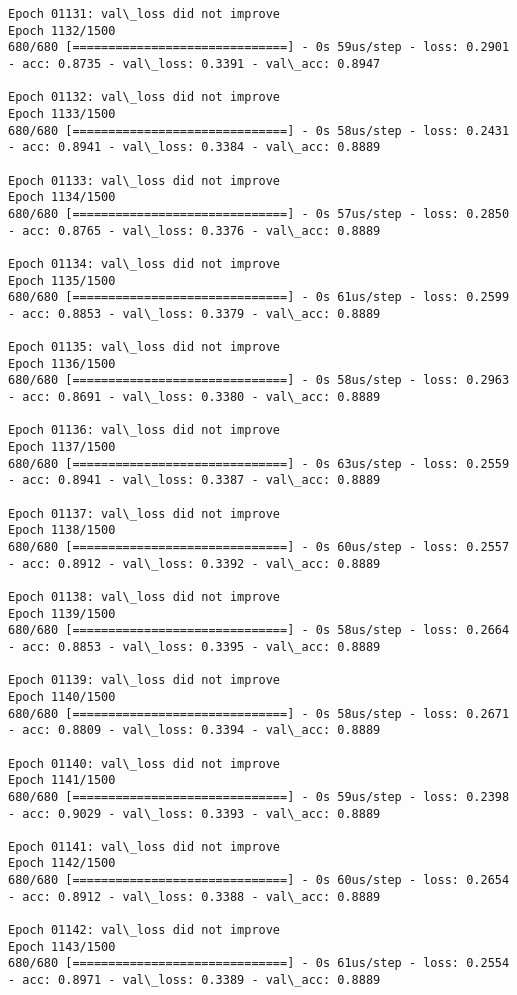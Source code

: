 \documentclass[11pt]{article}
\begin{document}
\begin{Verbatim}[commandchars=\\\{\}]
Epoch 01131: val\_loss did not improve
Epoch 1132/1500
680/680 [==============================] - 0s 59us/step - loss: 0.2901 - acc: 0.8735 - val\_loss: 0.3391 - val\_acc: 0.8947

Epoch 01132: val\_loss did not improve
Epoch 1133/1500
680/680 [==============================] - 0s 58us/step - loss: 0.2431 - acc: 0.8941 - val\_loss: 0.3384 - val\_acc: 0.8889

Epoch 01133: val\_loss did not improve
Epoch 1134/1500
680/680 [==============================] - 0s 57us/step - loss: 0.2850 - acc: 0.8765 - val\_loss: 0.3376 - val\_acc: 0.8889

Epoch 01134: val\_loss did not improve
Epoch 1135/1500
680/680 [==============================] - 0s 61us/step - loss: 0.2599 - acc: 0.8853 - val\_loss: 0.3379 - val\_acc: 0.8889

Epoch 01135: val\_loss did not improve
Epoch 1136/1500
680/680 [==============================] - 0s 58us/step - loss: 0.2963 - acc: 0.8691 - val\_loss: 0.3380 - val\_acc: 0.8889

Epoch 01136: val\_loss did not improve
Epoch 1137/1500
680/680 [==============================] - 0s 63us/step - loss: 0.2559 - acc: 0.8941 - val\_loss: 0.3387 - val\_acc: 0.8889

Epoch 01137: val\_loss did not improve
Epoch 1138/1500
680/680 [==============================] - 0s 60us/step - loss: 0.2557 - acc: 0.8912 - val\_loss: 0.3392 - val\_acc: 0.8889

Epoch 01138: val\_loss did not improve
Epoch 1139/1500
680/680 [==============================] - 0s 58us/step - loss: 0.2664 - acc: 0.8853 - val\_loss: 0.3395 - val\_acc: 0.8889

Epoch 01139: val\_loss did not improve
Epoch 1140/1500
680/680 [==============================] - 0s 58us/step - loss: 0.2671 - acc: 0.8809 - val\_loss: 0.3394 - val\_acc: 0.8889

Epoch 01140: val\_loss did not improve
Epoch 1141/1500
680/680 [==============================] - 0s 59us/step - loss: 0.2398 - acc: 0.9029 - val\_loss: 0.3393 - val\_acc: 0.8889

Epoch 01141: val\_loss did not improve
Epoch 1142/1500
680/680 [==============================] - 0s 60us/step - loss: 0.2654 - acc: 0.8912 - val\_loss: 0.3388 - val\_acc: 0.8889

Epoch 01142: val\_loss did not improve
Epoch 1143/1500
680/680 [==============================] - 0s 61us/step - loss: 0.2554 - acc: 0.8971 - val\_loss: 0.3389 - val\_acc: 0.8889


\end{Verbatim}
\end{document}
